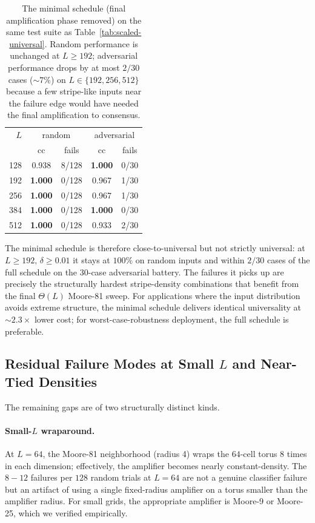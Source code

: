 \documentclass[11pt,a4paper]{article}
\begin{document}
\begin{table}[h]\centering\small
\begin{tabular}{r cc cc}
\toprule
$L$ & \multicolumn{2}{c}{random}
    & \multicolumn{2}{c}{adversarial} \\
    & cc & fails
    & cc & fails \\
\midrule
128 & 0.938 & 8/128 & \textbf{1.000} & 0/30 \\
192 & \textbf{1.000} & 0/128 & 0.967 & 1/30 \\
256 & \textbf{1.000} & 0/128 & 0.967 & 1/30 \\
384 & \textbf{1.000} & 0/128 & \textbf{1.000} & 0/30 \\
512 & \textbf{1.000} & 0/128 & 0.933 & 2/30 \\
\bottomrule
\end{tabular}
\caption{The minimal schedule (final amplification phase removed) on
the same test suite as Table~\ref{tab:scaled-universal}.  Random
performance is unchanged at \(L\geq 192\); adversarial performance
drops by at most \(2/30\) cases (\(\sim 7\%\)) on \(L\in\{192,256,512\}\)
because a few stripe-like inputs near the failure edge would have
needed the final amplification to consensus.}
\label{tab:minimal-schedule}
\end{table}

The minimal schedule is therefore close-to-universal but not strictly
universal: at \(L\geq 192,\,\delta\geq 0.01\) it stays at \(100\%\) on
random inputs and within \(2/30\) cases of the full schedule on the
30-case adversarial battery.  The failures it picks up are precisely
the structurally hardest stripe-density combinations that benefit
from the final \(\Theta(L)\) Moore-81 sweep.  For applications where
the input distribution avoids extreme structure, the minimal schedule
delivers identical universality at \(\sim 2.3\times\) lower cost; for
worst-case-robustness deployment, the full schedule is preferable.

\subsection{Residual Failure Modes at Small \(L\) and Near-Tied Densities}

The remaining gaps are of two structurally distinct kinds.

\paragraph{Small-\(L\) wraparound.}
At \(L=64\), the Moore-81 neighborhood (radius 4) wraps the \(64\)-cell torus
8 times in each dimension; effectively, the amplifier becomes nearly
constant-density.  The \(8{-}12\) failures per \(128\) random trials at
\(L=64\) are not a genuine classifier failure but an artifact of using a
single fixed-radius amplifier on a torus smaller than the amplifier radius.
For small grids, the appropriate amplifier is Moore-9 or Moore-25, which we
verified empirically.
\end{document}
